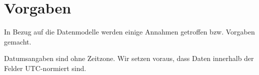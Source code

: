 \section{Vorgaben}
\label{Vorgaben}
In Bezug auf die Datenmodelle werden einige Annahmen getroffen bzw. Vorgaben gemacht.

Datumsangaben sind ohne Zeitzone. Wir setzen voraus, dass Daten innerhalb der Felder UTC-normiert sind.